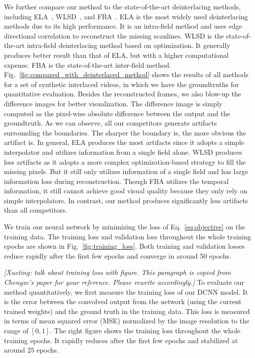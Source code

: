 \documentclass[acmtog]{acmart}
\begin{document}
We further compare our method to the state-of-the-art deinterlacing methods,
including ELA~\cite{doyle1990interlaced}, WLSD~\cite{wang2014interlacing}, and
FBA~\cite{vedadi2013interlacing}. ELA is the most widely used deinterlacing
methods due to its high performance. It is an intra-field method and uses edge
directional correlation to reconstruct the missing scanlines. WLSD is the state-of-the-art intra-field deinterlacing method based on optimization. It generally
produces better result than that of ELA, but with a higher computational
expense. FBA is the state-of-the-art inter-field method.
Fig.~\ref{fig:compared_with_deinterlaced_method} shows the results of all
methods for a set of synthetic interlaced videos, in which we have the
groundtruths for quantitative evaluation. Besides the reconstructed frames, we
also blow-up the difference images for better visualization. The difference
image is simply computed as the pixel-wise absolute difference between the
output and the groundtruth. As we can observe, all our competitors
generate artifacts surrounding the boundaries. The sharper the boundary is, the more
obvious the artifact is. In general, ELA produces the most artifacts since it
adopts a simple interpolator and utilizes information from a single field alone. 
WLSD produces less artifacts as it adopts a more complex optimization-based strategy to fill the missing pixels. But it still
only utilizes information of a single field and has large information loss
during reconstruction. Though FBA utilizes the temporal information, 
it still cannot achieve good visual quality because
they only rely on simple interpolators. In contrast, our method produces
significantly less artifacts than all competitors.

We train our neural network by minimizing the loss of Eq.~\ref{eq:objective} on
the training data. The training loss and validation loss throughout the whole
training epochs are shown in Fig.~\ref{fig:training_loss}. Both training and
validation losses reduce rapidly after the first few epochs and converge in
around 50 epochs.

{\color{red} {\em [Xueting: talk about training loss with figure. This paragraph is copied from Chengze's paper for your reference. Please rewrite accordingly.]} To evaluate our method quantitatively, we first measure the training
loss of our DCNN model. It is the error between the convolved output from the network
(using the current trained weights) and the ground truth in the training data.
This loss is measured in terms of mean squared error (MSE)
normalized by the image resolution to the range of $[0, 1]$.
The right figure shows the training loss throughout the whole training epochs.
It rapidly reduces after the first few epochs and stabilized at around 25 epochs.}\fi
\end{document}

